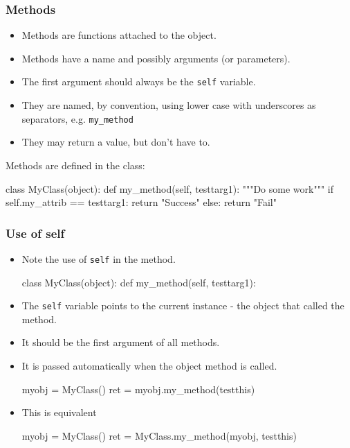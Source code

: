 \documentclass{beamer}
\begin{document}
\begin{frame}[fragile]
\frametitle{Methods}
\begin{itemize}
\item Methods are functions attached to the object.
\item Methods have a name and possibly arguments (or parameters).
\item The first argument should always be the \lstinline|self| variable.
\item They are named, by convention, using lower case with underscores as separators, 
e.g. \lstinline|my_method|
\item They may return a value, but don't have to.
\end{itemize}
Methods are defined in the class:
\begin{code}
class MyClass(object):
  def my_method(self, testtarg1):
    """Do some work"""
    if self.my_attrib == testtarg1:
    	return "Success"
    else:
    	return "Fail"
\end{code}

\end{frame}

\begin{frame}[fragile]
\frametitle{Use of self}
\begin{itemize}
\item Note the use of \lstinline|self| in the method.
\begin{code}
class MyClass(object):
  def my_method(self, testtarg1):
\end{code}
\item The \lstinline|self| variable points to the current instance - 
the object that called the method.
\item It should be the first argument of all methods.
\item It is passed automatically when the object method is called.
\begin{code}
myobj = MyClass()
ret = myobj.my_method(testthis)
\end{code}
\item This is equivalent
\begin{code}
myobj = MyClass()
ret = MyClass.my_method(myobj, testthis)
\end{code}
\end{itemize}

\end{frame}
\end{document}
